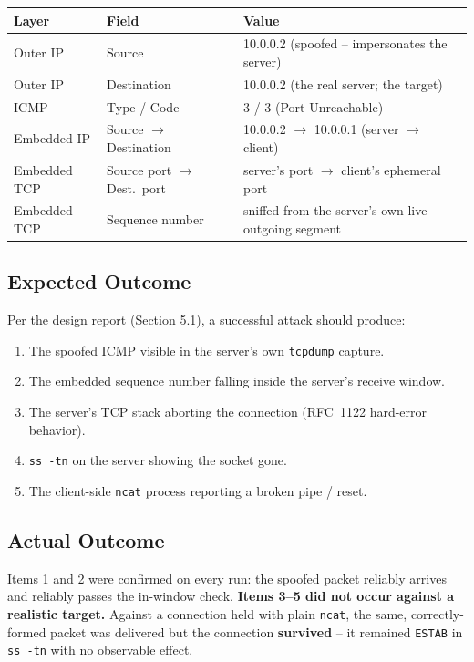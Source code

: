 \documentclass[11pt]{article}
\begin{document}
\begin{center}
\begin{tabular}{@{}lll@{}}
\toprule
\textbf{Layer} & \textbf{Field} & \textbf{Value} \\
\midrule
Outer IP & Source & 10.0.0.2 (spoofed -- impersonates the server) \\
Outer IP & Destination & 10.0.0.2 (the real server; the target) \\
ICMP & Type / Code & 3 / 3 (Port Unreachable) \\
Embedded IP & Source $\to$ Destination & 10.0.0.2 $\to$ 10.0.0.1 (server $\to$ client) \\
Embedded TCP & Source port $\to$ Dest.\ port & server's port $\to$ client's ephemeral port \\
Embedded TCP & Sequence number & sniffed from the server's own live outgoing segment \\
\bottomrule
\end{tabular}
\end{center}

\subsection{Expected Outcome}

Per the design report (Section 5.1), a successful attack should produce:
\begin{enumerate}
    \item The spoofed ICMP visible in the server's own \texttt{tcpdump} capture.
    \item The embedded sequence number falling inside the server's receive window.
    \item The server's TCP stack aborting the connection (RFC~1122 hard-error behavior).
    \item \texttt{ss -tn} on the server showing the socket gone.
    \item The client-side \texttt{ncat} process reporting a broken pipe / reset.
\end{enumerate}

\subsection{Actual Outcome}

Items 1 and 2 were confirmed on every run: the spoofed packet reliably
arrives and reliably passes the in-window check. \textbf{Items 3--5 did
not occur against a realistic target.} Against a connection held with
plain \texttt{ncat}, the same, correctly-formed packet was delivered but
the connection \textbf{survived} -- it remained \texttt{ESTAB} in
\texttt{ss -tn} with no observable effect.
\end{document}
